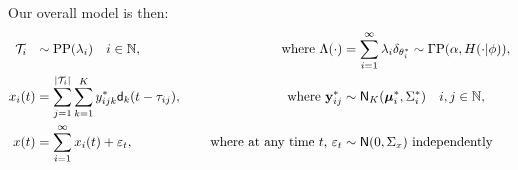 
Our overall model is then:
\begin{subequations}
\begin{align}
  \mc{T}_i\ \  &\sim \text{PP}(\lambda_i) \quad i \in \NN, \quad &\text{ where } \Lambda(\cdot)&=\sum_{i=1}^{\infty} \lambda_i \delta_{\theta^*_i} \sim \Gamma \text{P}(\alpha, H(\cdot| {\phi})), \\ %
\vspace{-.8in}
  x_i(t) &= \sum_{j = 1}^{|\mc{T}_i|}  \sum_{k = 1}^{K} y^*_{ijk} \mathsf{d}_k(t - \tau_{ij}), \quad &\text{ where }\by^*_{ij}  &\sim \mathsf{N}_K(\mb{\mu}^*_i, \Sigma^*_i) \quad i,j \in \NN, \\
  x(t)   &= \sum_{i=1}^{\infty} x_i(t) + \eps_t, \quad &\text{ where at any time $t$, } \eps_t &\sim \mathsf{N}(0,\Sigma_x) \text{ independently}
\end{align}
\end{subequations}

